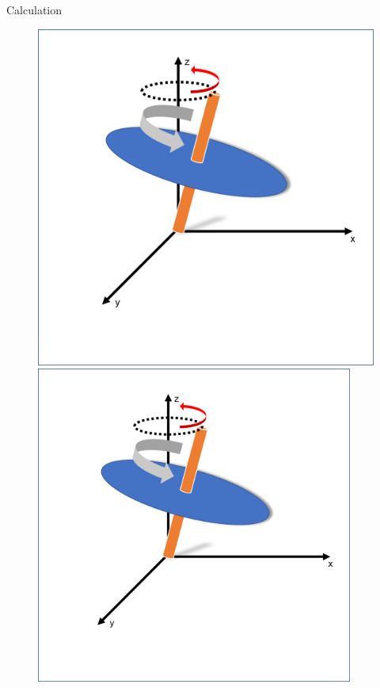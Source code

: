 \documentclass[10pt]{beamer}
\begin{document}
\begin{frame}{Calculation}


\begin{figure}
	\begin{minipage}{0.48\textwidth}
		\centering
		\includegraphics[width=1.05\textwidth]{sphere1.png}
	\end{minipage}
	\begin{minipage}{0.48\textwidth}
		\centering
		\includegraphics[width=0.93\textwidth]{sphere1.png}
	\end{minipage}
\end{figure}

\end{frame}
\end{document}
